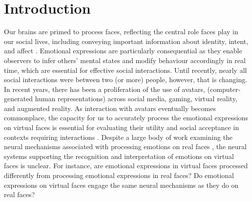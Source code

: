 \section*{Introduction}
Our brains are primed to process faces, reflecting the central role faces play in our social lives, including conveying important information about identity, intent, and affect \citep{johnson_newborns_1991, palmer_face_2020, powell_social_2018}.
Emotional expressions are particularly consequential as they enable observers to infer others' mental states and modify behaviour accordingly in real time, which are essential for effective social interactions. 
Until recently, nearly all social interactions were between two (or more) people, however, that is changing. 
In recent years, there has been a proliferation of the use of avatars, (computer-generated human representations) across social media, gaming, virtual reality, and augmented reality.
As interaction with avatars eventually becomes commonplace, the capacity for us to accurately process the emotional expressions on virtual faces is essential for evaluating their utility and social acceptance in contexts requiring interactions \citep{kegel_dynamic_2020}. 
Despite a large body of work examining the neural mechanisms associated with processing emotions on real faces \citep{barrett_are_2006}, the neural systems supporting the recognition and interpretation of emotions on virtual faces is unclear. 
For instance, are emotional expressions in virtual faces processed differently from processing emotional expressions in real faces? 
Do emotional expressions on virtual faces engage the same neural mechanisms as they do on real faces? 

